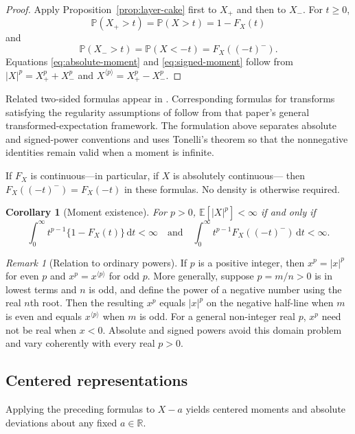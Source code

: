 \documentclass[11pt]{article}
\newtheorem{corollary}[theorem]{Corollary}
\theoremstyle{definition}
\theoremstyle{remark}
\newtheorem{remark}[theorem]{Remark}
\newcommand{\E}{\mathbb{E}}
\newcommand{\Pp}{\mathbb{P}}
\newcommand{\R}{\mathbb{R}}
\newcommand{\dd}{\,\mathrm{d}}
\newcommand{\abs}[1]{\left\lvert #1\right\rvert}
\newcommand{\spow}[2]{#1^{\langle #2\rangle}}
\begin{document}
\begin{proof}
Apply Proposition~\ref{prop:layer-cake} first to $X_+$ and then to $X_-$.
For $t\geq0$,
\[
  \Pp(X_+>t)=\Pp(X>t)=1-F_X(t)
\]
and
\[
  \Pp(X_->t)=\Pp(X<-t)=F_X((-t)^-).
\]
Equations \eqref{eq:absolute-moment} and \eqref{eq:signed-moment} follow
from $\abs{X}^p=X_+^p+X_-^p$ and
$\spow{X}{p}=X_+^p-X_-^p$.
\end{proof}

Related two-sided formulas appear in \citet{NadarajahOkorie2022}.
Corresponding formulas for transforms satisfying the regularity assumptions
of \citet{Liu2020} follow from that paper's general transformed-expectation
framework.  The formulation above separates absolute and signed-power
conventions and uses Tonelli's theorem so that the nonnegative identities
remain valid when a moment is infinite.

If $F_X$ is continuous---in particular, if $X$ is absolutely continuous---
then $F_X((-t)^-)=F_X(-t)$ in these formulas.  No density is otherwise required.

\begin{corollary}[Moment existence]\label{cor:existence}
For $p>0$, $\E[\abs{X}^p]<\infty$ if and only if
\[
  \int_0^\infty t^{p-1}\{1-F_X(t)\}\dd t<\infty
  \quad\text{and}\quad
  \int_0^\infty t^{p-1}F_X((-t)^-)\dd t<\infty.
\]
\end{corollary}

\begin{remark}[Relation to ordinary powers]\label{rem:ordinary-powers}
If $p$ is a positive integer, then $x^p=\abs{x}^p$ for even $p$ and
$x^p=\spow{x}{p}$ for odd $p$.  More generally, suppose
$p=m/n>0$ is in lowest terms and $n$ is odd, and define the power of a
negative number using the real $n$th root.  Then the resulting $x^p$ equals
$\abs{x}^p$ on the negative half-line when $m$ is even and equals
$\spow{x}{p}$ when $m$ is odd.  For a general non-integer real $p$, $x^p$
need not be real when $x<0$.  Absolute and signed powers avoid this domain
problem and vary coherently with every real $p>0$.
\end{remark}

\subsection{Centered representations}

Applying the preceding formulas to $X-a$ yields centered moments and
absolute deviations about any fixed $a\in\R$.
\end{document}
